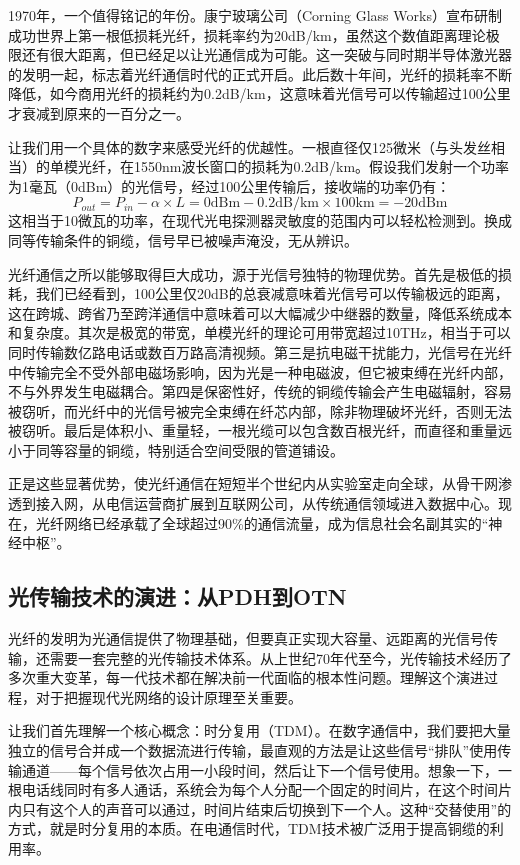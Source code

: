 1970年，一个值得铭记的年份。康宁玻璃公司（Corning Glass Works）宣布研制成功世界上第一根低损耗光纤，损耗率约为20dB/km，虽然这个数值距离理论极限还有很大距离，但已经足以让光通信成为可能。这一突破与同时期半导体激光器的发明一起，标志着光纤通信时代的正式开启。此后数十年间，光纤的损耗率不断降低，如今商用光纤的损耗约为0.2dB/km，这意味着光信号可以传输超过100公里才衰减到原来的一百分之一。

让我们用一个具体的数字来感受光纤的优越性。一根直径仅125微米（与头发丝相当）的单模光纤，在1550nm波长窗口的损耗为0.2dB/km。假设我们发射一个功率为1毫瓦（0dBm）的光信号，经过100公里传输后，接收端的功率仍有：
\[
P_{out} = P_{in} - \alpha \times L = 0\text{dBm} - 0.2\text{dB/km} \times 100\text{km} = -20\text{dBm}
\]
这相当于10微瓦的功率，在现代光电探测器灵敏度的范围内可以轻松检测到。换成同等传输条件的铜缆，信号早已被噪声淹没，无从辨识。

光纤通信之所以能够取得巨大成功，源于光信号独特的物理优势。首先是极低的损耗，我们已经看到，100公里仅20dB的总衰减意味着光信号可以传输极远的距离，这在跨城、跨省乃至跨洋通信中意味着可以大幅减少中继器的数量，降低系统成本和复杂度。其次是极宽的带宽，单模光纤的理论可用带宽超过10THz，相当于可以同时传输数亿路电话或数百万路高清视频。第三是抗电磁干扰能力，光信号在光纤中传输完全不受外部电磁场影响，因为光是一种电磁波，但它被束缚在光纤内部，不与外界发生电磁耦合。第四是保密性好，传统的铜缆传输会产生电磁辐射，容易被窃听，而光纤中的光信号被完全束缚在纤芯内部，除非物理破坏光纤，否则无法被窃听。最后是体积小、重量轻，一根光缆可以包含数百根光纤，而直径和重量远小于同等容量的铜缆，特别适合空间受限的管道铺设。

正是这些显著优势，使光纤通信在短短半个世纪内从实验室走向全球，从骨干网渗透到接入网，从电信运营商扩展到互联网公司，从传统通信领域进入数据中心。现在，光纤网络已经承载了全球超过90\%的通信流量，成为信息社会名副其实的“神经中枢”。

\subsection{光传输技术的演进：从PDH到OTN}

光纤的发明为光通信提供了物理基础，但要真正实现大容量、远距离的光信号传输，还需要一套完整的光传输技术体系。从上世纪70年代至今，光传输技术经历了多次重大变革，每一代技术都在解决前一代面临的根本性问题。理解这个演进过程，对于把握现代光网络的设计原理至关重要。

让我们首先理解一个核心概念：时分复用（TDM）。在数字通信中，我们要把大量独立的信号合并成一个数据流进行传输，最直观的方法是让这些信号“排队”使用传输通道——每个信号依次占用一小段时间，然后让下一个信号使用。想象一下，一根电话线同时有多人通话，系统会为每个人分配一个固定的时间片，在这个时间片内只有这个人的声音可以通过，时间片结束后切换到下一个人。这种“交替使用”的方式，就是时分复用的本质。在电通信时代，TDM技术被广泛用于提高铜缆的利用率。


